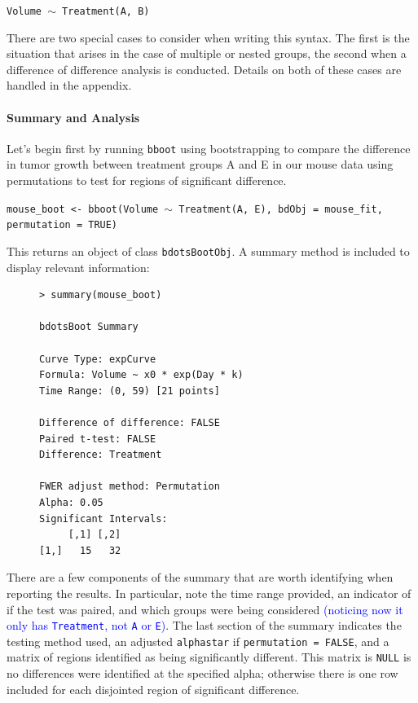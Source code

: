 \documentclass{article}
\providecommand{\cn}[1]{\textcolor{blue}{#1}}
\newcommand{\xt}{\texttt}%
\begin{document}
\begin{center}
\tt Volume $\sim$ Treatment(A, B)
\end{center}

There are two special cases to consider when writing this syntax. The first is the situation that arises in the case of multiple or nested groups, the second when a difference of difference analysis is conducted. Details on both of these cases are handled in the appendix. 



\paragraph{Summary and Analysis}

Let's begin first by running \xt{bboot} using bootstrapping to compare the difference in tumor growth between treatment groups A and E in our mouse data using permutations to test for regions of significant difference. 


\begin{center}
\tt mouse\_boot <- bboot(Volume $\sim$ Treatment(A, E), bdObj = mouse\_fit, permutation = TRUE)
\end{center}


This returns an object of class \xt{bdotsBootObj}. A summary method is included to display relevant information:

\begin{singlespace}
\begin{figure}[H]
\centering
\begin{BVerbatim}
> summary(mouse_boot)

bdotsBoot Summary

Curve Type: expCurve 
Formula: Volume ~ x0 * exp(Day * k) 
Time Range: (0, 59) [21 points]

Difference of difference: FALSE 
Paired t-test: FALSE 
Difference: Treatment 

FWER adjust method: Permutation 
Alpha: 0.05 
Significant Intervals:
     [,1] [,2]
[1,]   15   32
\end{BVerbatim}
\end{figure}
\end{singlespace}

There are a few components of the summary that are worth identifying when reporting the results. In particular, note the time range provided, an indicator of if the test was paired, and which groups were being considered \cn{(noticing now it only has \xt{Treatment}, not \xt{A} or \xt{E})}. The last section of the summary indicates the testing method used, an adjusted \xt{alphastar} if \xt{permutation = FALSE}, and a matrix of regions identified as being significantly different. This matrix is \xt{NULL} is no differences were identified at the specified alpha; otherwise there is one row included for each disjointed region of significant difference.
\end{document}
